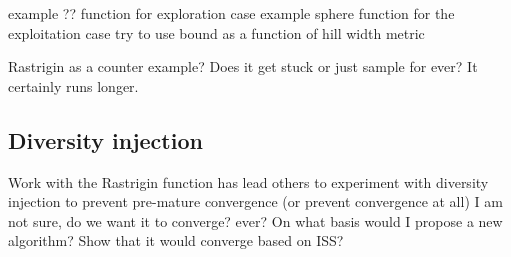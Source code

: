 example ?? function for exploration case
example sphere function for the exploitation case
try to use bound as a function of hill width metric

Rastrigin as a counter example? Does it get stuck or just sample for ever? It certainly runs longer.

\subsection{Diversity injection}

Work with the Rastrigin function has lead others to experiment with diversity injection to prevent pre-mature convergence (or prevent convergence at all)
I am not sure, do we want it to converge? ever?
On what basis would I propose a new algorithm?
Show that it would converge based on ISS?